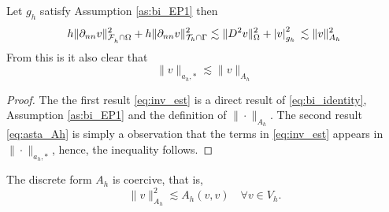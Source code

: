 \begin{corollary}
    \label{cor:bi_inverse_thm}
    Let $g_{h}$ satisfy Assumption \ref{as:bi_EP1} then
    \begin{equation}
        \label{eq:inv_est}
            h\| \partial _{nn}  v \|_{ \mathcal{F}_h^{} \cap \Omega    }^{2 } + h\| \partial _{nn} v \|_{ \mathcal{T} _{h} \cap \Gamma  }^{2  }   \lesssim  \| D^2 v \|_{ \Omega  }^{ 2 } + \left\lvert  v  \right\rvert _{g_{h}}^{2} \\
              \lesssim \| v \|_{ A_{h} }^{  2}
    \end{equation}
    From this is it also clear that \begin{equation}
        \label{eq:asta_Ah}
    \| v \|_{ a_{h},* }^{  }  \lesssim \| v \|_{ A_{h} }^{  }
    \end{equation}
\end{corollary}
\begin{proof}
    The the first result \eqref{eq:inv_est} is a direct result of \eqref{eq:bi_identity}, Assumption \ref{as:bi_EP1} and the definition of $\| \cdot  \|_{ A_{h} }^{  } $.
    The second result \eqref{eq:asta_Ah} is simply a observation that the terms in \eqref{eq:inv_est} appears in $\| \cdot   \|_{a_{h},*  }^{  } $, hence, the inequality follows.
\end{proof}

\begin{lemma}
    \label{lemma:bi_Ah_coercive}
    The discrete form $A_{h}$ is coercive, that is, \[
    \| v \|_{ A_{h} }^{ 2 }  \lesssim A_{h}( v,v)\quad  \forall v \in V_{h}.
    \]
\end{lemma}

